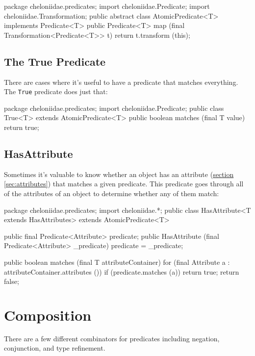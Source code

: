 \documentclass{report}
\newcommand{\Ref}[2]{\hyperref[#2]{#1 \ref*{#2}}}
\begin{document}
\begin{javacode}
package cheloniidae.predicates;
import cheloniidae.Predicate;
import cheloniidae.Transformation;
public abstract class AtomicPredicate<T> implements Predicate<T> {
  public Predicate<T> map (final Transformation<Predicate<T>> t) {return t.transform (this);}
}
\end{javacode}

\subsection {The True Predicate} \label{sec:the-true-predicate}
        There are cases where it's useful to have a predicate that matches everything. The {\tt True} predicate does just that:

\begin{javacode}
package cheloniidae.predicates;
import cheloniidae.Predicate;
public class True<T> extends AtomicPredicate<T> {
  public boolean matches (final T value) {return true;}
}
\end{javacode}

\subsection {HasAttribute} \label{sec:hasattribute}
        Sometimes it's valuable to know whether an object has an attribute (\Ref{section}{sec:attributes}) that matches a given predicate. This predicate goes
        through all of the attributes of an object to determine whether any of them match:

\begin{javacode}
package cheloniidae.predicates;
import cheloniidae.*;
public class HasAttribute<T extends HasAttributes> extends AtomicPredicate<T> {
  public final Predicate<Attribute> predicate;
  public HasAttribute (final Predicate<Attribute> _predicate) {predicate = _predicate;}

  public boolean matches (final T attributeContainer) {
    for (final Attribute a : attributeContainer.attributes ())
      if (predicate.matches (a)) return true;
    return false;
  }
}
\end{javacode}

\section {Composition} \label{sec:composition}
      There are a few different combinators for predicates including negation, conjunction, and type refinement.
\end{document}
